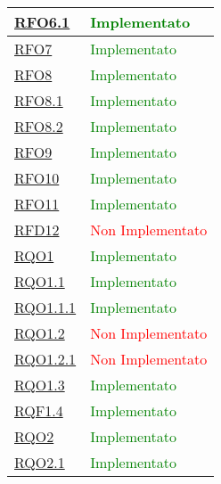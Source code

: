 \begin{longtable}{|>{\centering}m{5cm}|m{5cm}<{\centering}|}
\hyperlink{RFO6.1}{RFO6.1} & \textcolor{green}{Implementato}\\ \hline

\hyperlink{RFO7}{RFO7} &  \textcolor{green}{Implementato}\\ \hline

\hyperlink{RFO8}{RFO8} &  \textcolor{green}{Implementato}\\ \hline

\hyperlink{RFO8.1}{RFO8.1} &  \textcolor{green}{Implementato}\\ \hline

\hyperlink{RFO8.2}{RFO8.2} & \textcolor{green}{Implementato}\\ \hline

\hyperlink{RFO9}{RFO9} & \textcolor{green}{Implementato}\\ \hline
	
\hyperlink{RFO10}{RFO10} &  \textcolor{green}{Implementato}\\ \hline

\hyperlink{RFO11}{RFO11} &  \textcolor{green}{Implementato}\\ \hline

\hyperlink{RFD12}{RFD12} &  \textcolor{red}{Non Implementato}\\ \hline

\hyperlink{RQO1}{RQO1} & \textcolor{green}{Implementato}\\ \hline

\hyperlink{RQO1.1}{RQO1.1} &  \textcolor{green}{Implementato}\\ \hline

\hyperlink{RQO1.1.1}{RQO1.1.1} &  \textcolor{green}{Implementato}\\ \hline

\hyperlink{RQO1.2}{RQO1.2} & \textcolor{red}{Non Implementato}\\ \hline

\hyperlink{RQO1.2.1}{RQO1.2.1} & \textcolor{red}{Non Implementato}\\ \hline

\hyperlink{RQO1.3}{RQO1.3} &  \textcolor{green}{Implementato}\\ \hline

\hyperlink{RQF1.4}{RQF1.4} & \textcolor{green}{Implementato}\\ \hline

\hyperlink{RQO2}{RQO2} & \textcolor{green}{Implementato}\\ \hline

\hyperlink{RQO2.1}{RQO2.1} & \textcolor{green}{Implementato}\\ \hline


\end{longtable}
